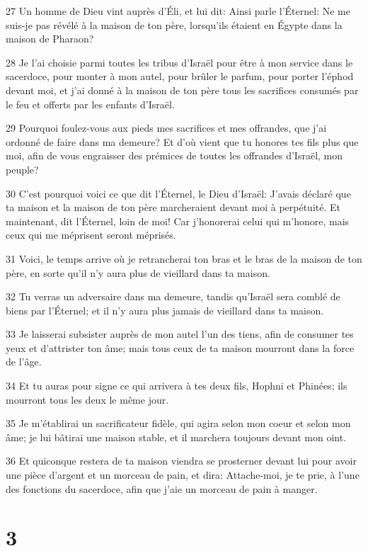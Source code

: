 \par 27 Un homme de Dieu vint auprès d'Éli, et lui dit: Ainsi parle l'Éternel: Ne me suis-je pas révélé à la maison de ton père, lorsqu'ils étaient en Égypte dans la maison de Pharaon?
\par 28 Je l'ai choisie parmi toutes les tribus d'Israël pour être à mon service dans le sacerdoce, pour monter à mon autel, pour brûler le parfum, pour porter l'éphod devant moi, et j'ai donné à la maison de ton père tous les sacrifices consumés par le feu et offerts par les enfants d'Israël.
\par 29 Pourquoi foulez-vous aux pieds mes sacrifices et mes offrandes, que j'ai ordonné de faire dans ma demeure? Et d'où vient que tu honores tes fils plus que moi, afin de vous engraisser des prémices de toutes les offrandes d'Israël, mon peuple?
\par 30 C'est pourquoi voici ce que dit l'Éternel, le Dieu d'Israël: J'avais déclaré que ta maison et la maison de ton père marcheraient devant moi à perpétuité. Et maintenant, dit l'Éternel, loin de moi! Car j'honorerai celui qui m'honore, mais ceux qui me méprisent seront méprisés.
\par 31 Voici, le temps arrive où je retrancherai ton bras et le bras de la maison de ton père, en sorte qu'il n'y aura plus de vieillard dans ta maison.
\par 32 Tu verras un adversaire dans ma demeure, tandis qu'Israël sera comblé de biens par l'Éternel; et il n'y aura plus jamais de vieillard dans ta maison.
\par 33 Je laisserai subsister auprès de mon autel l'un des tiens, afin de consumer tes yeux et d'attrister ton âme; mais tous ceux de ta maison mourront dans la force de l'âge.
\par 34 Et tu auras pour signe ce qui arrivera à tes deux fils, Hophni et Phinées; ils mourront tous les deux le même jour.
\par 35 Je m'établirai un sacrificateur fidèle, qui agira selon mon coeur et selon mon âme; je lui bâtirai une maison stable, et il marchera toujours devant mon oint.
\par 36 Et quiconque restera de ta maison viendra se prosterner devant lui pour avoir une pièce d'argent et un morceau de pain, et dira: Attache-moi, je te prie, à l'une des fonctions du sacerdoce, afin que j'aie un morceau de pain à manger.

\chapter{3}

